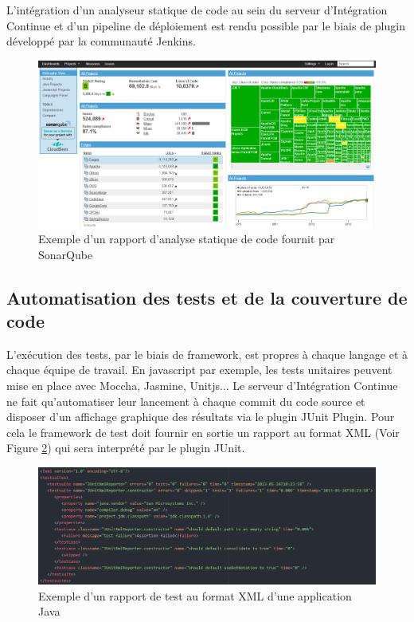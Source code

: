     L'intégration d'un analyseur statique de code au sein du serveur d'Intégration Continue et d'un pipeline de déploiement est rendu possible par le biais de plugin développé par la communauté Jenkins.

    \begin{figure}
      \begin{center}
        \includegraphics[scale=0.3]{images/SonarQube.png}
      \end{center}
      \caption{Exemple d'un rapport d'analyse statique de code fournit par SonarQube}
      \label{SonarQube}
    \end{figure}

    \subsection{Automatisation des tests et de la couverture de code}
    L'exécution des tests, par le biais de framework, est propres à chaque langage et à chaque équipe de travail. En javascript par exemple, les tests unitaires peuvent mise en place avec Moccha, Jasmine, Unitjs... Le serveur d'Intégration Continue ne fait qu'automatiser leur lancement à chaque commit du code source et disposer d'un affichage graphique des résultats via le plugin JUnit Plugin. Pour cela le framework de test doit fournir en sortie un rapport au format XML (Voir Figure \ref{ReportXML}) qui sera interprété par le plugin JUnit.

    \begin{figure}
      \begin{center}
        \includegraphics[scale=0.5]{images/ReportXML.png}
      \end{center}
      \caption{Exemple d'un rapport de test au format XML d'une application Java}
      \label{ReportXML}
    \end{figure}

